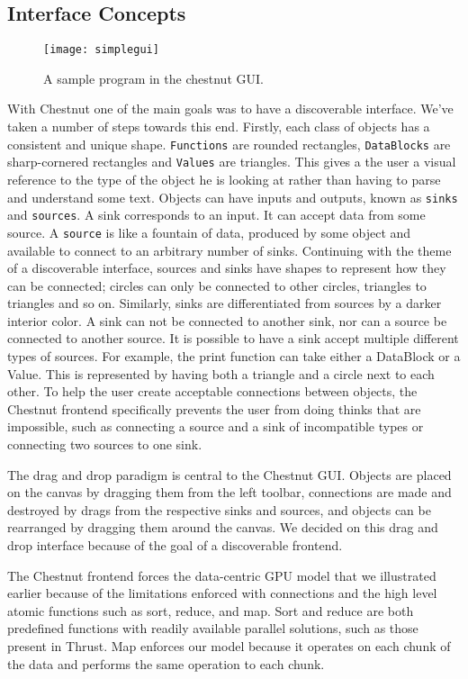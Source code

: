 \documentclass[twocolumn]{article}
\renewcommand{\|}{\origbar} %
\newcommand{\code}[1]{\texttt{#1}}
\begin{document}
\subsection{Interface Concepts}

\begin{figure}[h!]
  \centering
    \texttt{[image: simplegui]}
  \caption{A sample program in the chestnut GUI.}
\end{figure}

With Chestnut one of the main goals was to have a discoverable interface. We've taken a number of steps towards this end. Firstly, each class of objects has a consistent and unique shape. \code{Functions} are rounded rectangles, \code{DataBlocks} are sharp-cornered rectangles and \code{Values} are triangles. This gives a the user a visual reference to the type of the object he is looking at rather than having to parse and understand some text. Objects can have inputs and outputs, known as \code{sinks} and \code{sources}. A sink corresponds to an input. It can accept data from some source. A \code{source} is like a fountain of data, produced by some object and available to connect to an arbitrary number of sinks. Continuing with the theme of a discoverable interface, sources and sinks have shapes to represent how they can be connected; circles can only be connected to other circles, triangles to triangles and so on. Similarly, sinks are differentiated from sources by a darker interior color. A sink can not be connected to another sink, nor can a source be connected to another source. It is possible to have a sink accept multiple different types of sources. For example, the print function can take either a DataBlock or a Value. This is represented by having both a triangle and a circle next to each other. To help the user create acceptable connections between objects, the Chestnut frontend specifically prevents the user from doing thinks that are impossible, such as connecting a source and a sink of incompatible types or connecting two sources to one sink.

The drag and drop paradigm is central to the Chestnut GUI. Objects are placed on the canvas by dragging them from the left toolbar, connections are made and destroyed by drags from the respective sinks and sources, and objects can be rearranged by dragging them around the canvas. We decided on this drag and drop interface because of the goal of a discoverable frontend. 

The Chestnut frontend forces the data-centric GPU model that we illustrated earlier because of the limitations enforced with connections and the high level atomic functions such as sort, reduce, and map. Sort and reduce are both predefined functions with readily available parallel solutions, such as those present in Thrust. Map enforces our model because it operates on each chunk of the data and performs the same operation to each chunk.
\end{document}

